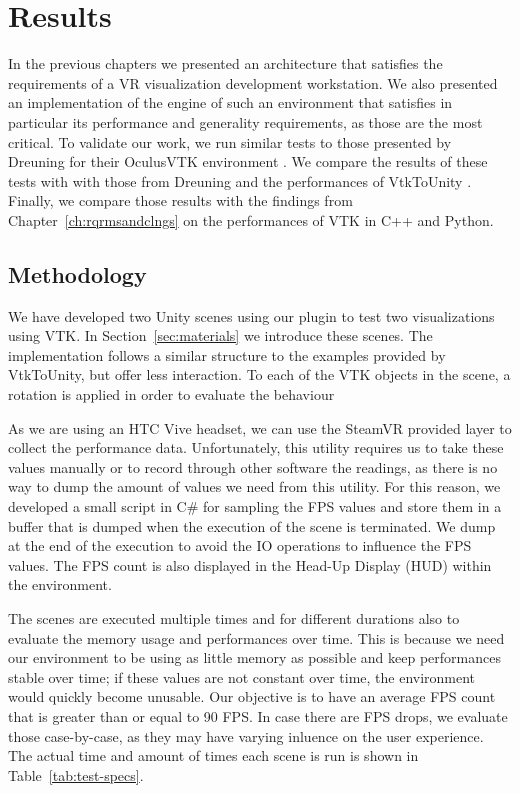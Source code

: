 \chapter{Results}
\label{ch:results}

In the previous chapters we presented an architecture that satisfies the requirements of a VR visualization development workstation. We also presented an implementation of the engine of such an environment that satisfies in particular its performance and generality requirements, as those are the most critical. To validate our work, we run similar tests to those presented by Dreuning for their OculusVTK environment \cite{dreuning_visual_2016}. We compare the results of these tests with with those from Dreuning and the performances of VtkToUnity \cite{wheeler_virtual_2018}. Finally, we compare those results with the findings from Chapter~\ref{ch:rqrmsandclngs} on the performances of VTK in C++ and Python.

\section{Methodology}

We have developed two Unity scenes using our plugin to test two visualizations using VTK. In Section~\ref{sec:materials} we introduce these scenes. The implementation follows a similar structure to the examples provided by VtkToUnity, but offer less interaction. To each of the VTK objects in the scene, a rotation is applied in order to evaluate the behaviour 

As we are using an HTC Vive headset, we can use the SteamVR provided layer to collect the performance data. Unfortunately, this utility requires us to take these values manually or to record through other software the readings, as there is no way to dump the amount of values we need from this utility. For this reason, we developed a small script in C\# for sampling the FPS values and store them in a buffer that is dumped when the execution of the scene is terminated. We dump at the end of the execution to avoid the IO operations to influence the FPS values. The FPS count is also displayed in the Head-Up Display (HUD) within the environment.

The scenes are executed multiple times and for different durations also to evaluate the memory usage and performances over time. This is because we need our environment to be using as little memory as possible and keep performances stable over time; if these values are not constant over time, the environment would quickly become unusable. Our objective is to have an average FPS count that is greater than or equal to 90 FPS. In case there are FPS drops, we evaluate those case-by-case, as they may have varying inluence on the user experience. The actual time and amount of times each scene is run is shown in Table~\ref{tab:test-specs}.

